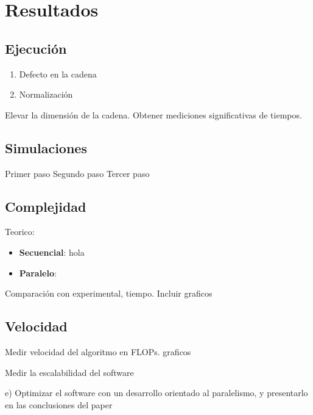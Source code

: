 \section{Resultados}

\subsection{Ejecución}

\begin{enumerate}
	\item Defecto en la cadena
	          
	\item Normalización
	          
\end{enumerate}

Elevar la dimensión de la cadena. Obtener mediciones significativas de tiempos.

\subsection{Simulaciones}
Primer paso
Segundo paso
Tercer paso

\subsection{Complejidad}

Teorico:

\begin{itemize}
	\item \textbf{Secuencial}:
	      hola
	\item \textbf{Paralelo}:
	          
\end{itemize}

Comparación con experimental, tiempo. Incluir graficos

\subsection{Velocidad}

Medir velocidad del algoritmo en FLOPs. graficos

Medir la escalabilidad del software

e) Optimizar el software con un desarrollo orientado al paralelismo, y presentarlo
en las conclusiones del paper